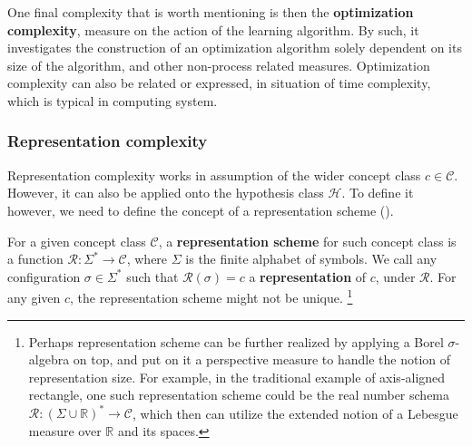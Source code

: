 \documentclass[10pt]{article} %
\begin{document}
One final complexity that is worth mentioning is then the \textbf{optimization complexity}, measure on the action of the learning algorithm. By such, it investigates the construction of an optimization algorithm solely dependent on its size of the algorithm, and other non-process related measures. Optimization complexity can also be related or expressed, in situation of time complexity, which is typical in computing system. 

\subsubsection{Representation complexity}

Representation complexity works in assumption of the wider concept class $c\in \mathcal{C}$. However, it can also be applied onto the hypothesis class $\mathcal{H}$. To define it however, we need to define the concept of a representation scheme (\cite{10.5555/200548}). 

\begin{definition}
    For a given concept class $\mathcal{C}$, a \textbf{representation scheme} for such concept class is a function $\mathcal{R}: \Sigma^{*}\to \mathcal{C}$, where $\Sigma$ is the finite alphabet of symbols. We call any configuration $\sigma \in \Sigma^{*}$ such that $\mathcal{R}(\sigma)=c$ a \textbf{representation} of $c$, under $\mathcal{R}$. For any given $c$, the representation scheme might not be unique. \footnote{Perhaps representation scheme can be further realized by applying a Borel $\sigma$-algebra on top, and put on it a perspective measure to handle the notion of representation size. For example, in the traditional example of axis-aligned rectangle, one such representation scheme could be the real number schema $\mathcal{R}:(\Sigma \cup \mathbb{R})^{*}\to \mathcal{C}$, which then can utilize the extended notion of a Lebesgue measure over $\mathbb{R}$ and its spaces.}
\end{definition} 
\end{document}
